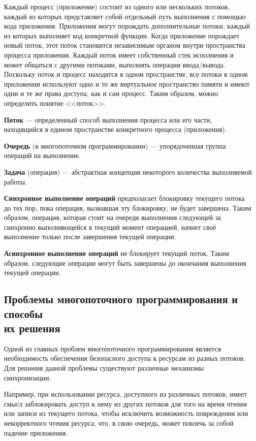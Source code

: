 Каждый процесс (приложение) состоит из одного или нескольких потоков, каждый из
которых представляет собой отдельный путь выполнения с помощью кода приложения.
Приложения могут порождать дополнительные потоки, каждый из которых выполняет
код конкретной функции. Когда приложение порождает новый поток, этот поток
становится независимым органом внутри пространства процесса приложения.
Каждый поток имеет собственный стек исполнения и может общаться
с другими потоками, выполнять операции ввода/вывода.
Поскольку поток и процесс находятся в одном пространстве, все потоки
в одном приложении используют одно и то же виртуальное пространство памяти
и имеют одни и те же права доступа, как и сам процесс. Таким образом, можно
определить понятие <<поток>>.

\textbf{Поток} --- определенный способ выполнения процесса или его части,
находящийся в едином пространстве конкретного процесса (приложения).

\textbf{Очередь} (в многопоточном программировании) --- упорядоченная группа
операций на выполнение.

\textbf{Задача} (операция) --- абстрактная концепция некоторого количества
выполняемой работы.

\textbf{Синхронное выполнение операций} предполагает блокировку текущего потока
до тех пор, пока операция, вызвавшая эту блокировку, не будет завершена.
Таким образом, операция, которая стоит на очереди выполнения следующей за синхронно
выполняющейся в текущий момент операцией, начнет своё выполнение только после
завершения текущей операции.

\textbf{Асинхронное выполнение операций} не блокирует текущий поток. Таким образом,
следующие операции могут быть завершены до окончания выполнения текущей операции.


\subsection{Проблемы многопоточного программирования и способы \\ их решения}

Одной из главных проблем многопоточного программирования является
необходимость обеспечения безопасного доступа к ресурсам из разных потоков.
Для решения дааной проблемы существуют различные механизмы синхронизации.

Например, при использовании ресурса, доступного из различных потоков,
имеет смысл заблокировать доступ к нему из других потоков для того на время
чтения или записи из текущего потока, чтобы исключить возможность повреждения или
некорректного чтения ресурса, что, в свою очередь, может повлечь за собой
падение приложения.

